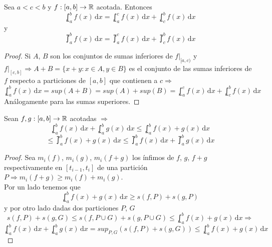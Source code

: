 \begin{theorem}
  Sea $a < c < b$ y $f: [a, b] \to \mathbb{R}$ acotada. Entonces \begin{equation}
    \lowint_a^b f(x)\,\mathrm{d}x = \lowint_a^c f(x)\,\mathrm{d}x + \lowint_c^b f(x)\,\mathrm{d}x
  \end{equation} y \begin{equation}
    \upint_a^b f(x)\, \mathrm{d}x = \upint_a^c f(x)\, \mathrm{d}x + \upint_c^b f(x)\, \mathrm{d}x
  \end{equation}

  \begin{proof}
    Si $A$, $B$ son los conjuntos de sumas inferiores de $f|_{[a, c)}$ y $f|_{[c, b]} \Rightarrow A + B = \{ x+y : x \in A, y \in B \}$ es el conjunto de las sumas inferiores de $f$ respecto a particiones
    de $[a, b]$ que contienen a $c \Rightarrow$ \begin{equation} 
      \lowint_a^b f(x)\,\mathrm{d}x = sup(A+B) = sup(A) + sup(B) = \lowint_a^c f(x)\,\mathrm{d}x + \lowint_c^b f(x)\,\mathrm{d}x
    \end{equation}
    Análogamente para las sumas superiores.
  \end{proof}
\end{theorem}

\begin{prop}
  Sean $f, g: [a, b] \to \mathbb{R}$ acotadas $\Rightarrow$
  \begin{equation} 
    \lowint_a^b f(x)\,\mathrm{d}x + \lowint_a^b g(x)\,\mathrm{d}x \leq \lowint_a^b f(x)+g(x)\,\mathrm{d}x 
  \end{equation}
  \begin{equation}
    \leq \upint_a^b f(x) + g(x)\, \mathrm{d}x \leq \upint_a^b f(x)\, \mathrm{d}x + \upint_a^b g(x)\, \mathrm{d}x
  \end{equation}
  \begin{proof}
    Sea $m_i(f)$, $m_i(g)$, $m_i(f+g)$ los ínfimos de $f$, $g$, $f+g$ respectivamente en $[t_{i-1}, t_i]$ de una partición $P \Rightarrow m_i(f+g) \geq m_i(f) + m_i(g)$. \\
    Por un lado tenemos que \begin{equation}
      \lowint_a^b f(x)+g(x)\, \mathrm{d}x \geq s(f, P) + s(g, P)
    \end{equation} y por otro lado dadas dos particiones $P$, $G$ \begin{equation}
      s(f, P) + s(g, G) \leq s(f, P \cup G) + s(g, P \cup G) \leq \lowint_a^b f(x)+g(x)\,\mathrm{d}x \Rightarrow
    \end{equation}
    \begin{equation}
      \lowint_a^b f(x) \, \mathrm{d}x + \lowint_a^b g(x) \, \mathrm{d}x = sup_{P, G}(s(f, P)+s(g, G)) \leq \lowint_a^b f(x) + g(x)\, \mathrm{d}x
    \end{equation}
  \end{proof}
\end{prop}

